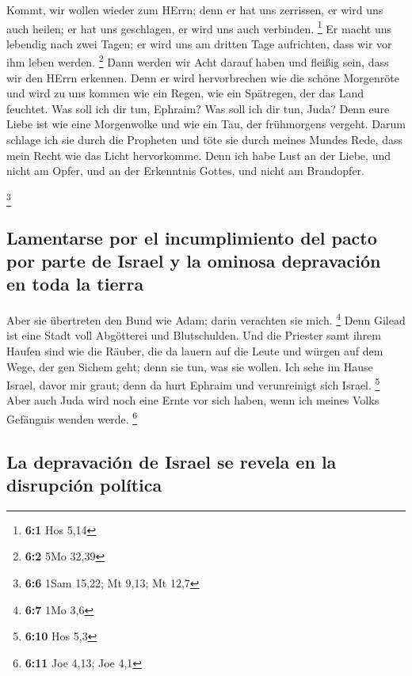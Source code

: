  Kommt, wir wollen wieder zum HErrn; denn er hat uns
zerrissen, er wird uns auch heilen; er hat uns geschlagen, er wird uns
auch verbinden. \footnote{\textbf{6:1} Hos 5,14}  Er macht
uns lebendig nach zwei Tagen; er wird uns am dritten Tage aufrichten,
dass wir vor ihm leben werden. \footnote{\textbf{6:2} 5Mo 32,39}
 Dann werden wir Acht darauf haben und fleißig sein, dass
wir den HErrn erkennen. Denn er wird hervorbrechen wie die schöne
Morgenröte und wird zu uns kommen wie ein Regen, wie ein Spätregen, der
das Land feuchtet.  Was soll ich dir tun, Ephraim? Was
soll ich dir tun, Juda? Denn eure Liebe ist wie eine Morgenwolke und wie
ein Tau, der frühmorgens vergeht.  Darum schlage ich sie
durch die Propheten und töte sie durch meines Mundes Rede, dass mein
Recht wie das Licht hervorkomme.  Denn ich habe Lust an
der Liebe, und nicht am Opfer, und an der Erkenntnis Gottes, und nicht
am Brandopfer.

\footnote{\textbf{6:6} 1Sam 15,22; Mt 9,13; Mt 12,7}

\hypertarget{lamentarse-por-el-incumplimiento-del-pacto-por-parte-de-israel-y-la-ominosa-depravaciuxf3n-en-toda-la-tierra}{%
\subsection{Lamentarse por el incumplimiento del pacto por parte de
Israel y la ominosa depravación en toda la
tierra}\label{lamentarse-por-el-incumplimiento-del-pacto-por-parte-de-israel-y-la-ominosa-depravaciuxf3n-en-toda-la-tierra}}

 Aber sie übertreten den Bund wie Adam; darin verachten
sie mich. \footnote{\textbf{6:7} 1Mo 3,6}  Denn Gilead ist
eine Stadt voll Abgötterei und Blutschulden.  Und die
Priester samt ihrem Haufen sind wie die Räuber, die da lauern auf die
Leute und würgen auf dem Wege, der gen Sichem geht; denn sie tun, was
sie wollen.  Ich sehe im Hause Israel, davor mir graut;
denn da hurt Ephraim und verunreinigt sich Israel. \footnote{\textbf{6:10}
  Hos 5,3}  Aber auch Juda wird noch eine Ernte vor sich
haben, wenn ich meines Volks Gefängnis wenden werde. \footnote{\textbf{6:11}
  Joe 4,13; Joe 4,1}

\hypertarget{la-depravaciuxf3n-de-israel-se-revela-en-la-disrupciuxf3n-poluxedtica}{%
\subsection{La depravación de Israel se revela en la disrupción
política}\label{la-depravaciuxf3n-de-israel-se-revela-en-la-disrupciuxf3n-poluxedtica}}


